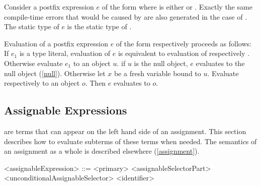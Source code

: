 \documentclass[makeidx]{article}
\begin{document}
{\LMHash{}%
Consider a postfix expression $e$ of the form 
where \op{} is either \lit{++} or \lit{-{}-}.
Exactly the same compile-time errors that would be caused by
are also generated in the case of .
The static type of $e$ is the static type of .

\LMHash{}%
Evaluation of a postfix expression $e$
of the form  respectively 
proceeds as follows:
If $e_1$ is a type literal, evaluation of $e$ is equivalent to
evaluation of  respectively .
Otherwise evaluate $e_1$ to an object $u$.
if $u$ is the null object, $e$ evaluates to the null object (\ref{null}).
Otherwise let $x$ be a fresh variable bound to $u$.
Evaluate  respectively  to an object $o$.
Then $e$ evaluates to $o$.
\EndCase


\subsection{Assignable Expressions}

\LMHash{}%
 are terms
that can appear on the left hand side of an assignment.
This section describes how to evaluate subterms of these terms when needed.
The semantics of an assignment as a whole is described elsewhere
(\ref{assignment}).


\begin{grammar}
<assignableExpression> ::= <primary> <assignableSelectorPart>
  \alt \SUPER{} <unconditionalAssignableSelector>
  \alt <identifier>


\end{grammar}}
\end{document}
